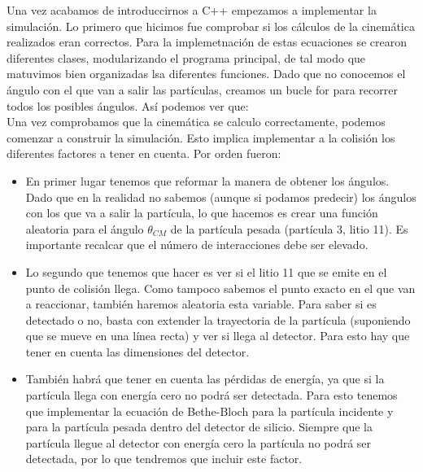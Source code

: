 \documentclass[12pt,a4paper]{article}
\numberwithin{equation}{section}
\numberwithin{figure}{section}
\begin{document}
Una vez acabamos de introduccirnos a C++ empezamos a implementar la simulación. Lo primero que hicimos fue comprobar si los cálculos  de la cinemática realizados eran correctos. Para la implemetnación de estas ecuaciones se crearon diferentes clases, modularizando el programa principal, de tal modo que matuvimos bien organizadas lsa diferentes funciones. Dado que no conocemos el ángulo con el que van a salir las partículas, creamos un bucle for para recorrer todos los posibles ángulos. Así podemos ver que:  \\


Una vez comprobamos que la cinemática se calculo correctamente, podemos comenzar a construir la simulación. Esto implica implementar a la colisión los diferentes factores a tener en cuenta. Por orden fueron:

\begin{itemize}
    \item En primer lugar tenemos que reformar la manera de obtener los ángulos. Dado que en la realidad no sabemos (aunque si podamos predecir) los ángulos con los que va a salir la partícula, lo que hacemos es crear una función aleatoria para el ángulo $\theta_{CM}$ de la partícula pesada (partícula 3, litio 11). Es importante recalcar que el número de interacciones debe ser elevado. 
    

    \item Lo segundo que tenemos que hacer es ver si el litio 11 que se emite en el punto de colisión llega. Como tampoco sabemos el punto exacto en el que van a reaccionar, también haremos aleatoria esta variable. Para saber si es detectado o no, basta con extender la trayectoria de la partícula (suponiendo que se mueve en una línea recta) y ver si llega al detector. Para esto hay que tener en cuenta las dimensiones del detector. 
    

    \item También habrá que tener en cuenta las pérdidas de energía, ya que si la partícula llega con energía cero no podrá ser detectada. Para esto tenemos que implementar la ecuación de Bethe-Bloch para la partícula incidente y para la partícula pesada dentro del detector de silicio. Siempre que la partícula llegue al detector con energía cero la partícula no podrá ser detectada, por lo que tendremos que incluir este factor. 
    

\end{itemize}
\end{document}
